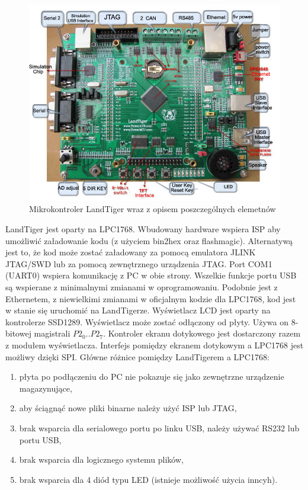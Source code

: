 \documentclass{BscUS}
\begin{document}
\begin{figure}[h]
\centering
\includegraphics{./img/landTiger3}
\caption{Mikrokontroler LandTiger wraz z opisem poszczególnych elemetnów \cite{landTiger3}}
\end{figure}
LandTiger jest oparty na LPC1768. Wbudowany hardware wspiera ISP aby umożliwić załadowanie kodu (z użyciem bin2hex oraz flashmagic).
Alternatywą jest to, że kod może zostać załadowany za pomocą emulatora JLINK JTAG/SWD lub za pomocą zewnętrznego urządzenia JTAG.
\newline
Port COM1 (UART0) wspiera komunikację z PC w obie strony. Wszelkie funkcje portu USB są wspierane z minimalnymi zmianami w oprogramowaniu. Podobnie jest z Ethernetem, z niewielkimi  zmianami w oficjalnym kodzie dla LPC1768, kod jest w stanie się uruchomić na LandTigerze.
\newline
\indent Wyświetlacz LCD jest oparty na kontrolerze SSD1289. Wyświetlacz może zostać odłączony od płyty. Używa on 8-bitowej magistrali \(P2_0..P2_7\). Kontroler ekranu dotykowego jest dostarczony razem z modułem wyświetlacza. Interfejs pomiędzy ekranem dotykowym a LPC1768 jest możliwy dzięki SPI.
\newline
Główne różnice pomiędzy LandTigerem a LPC1768:
\begin{enumerate} [label=(\alph*)]
\item płyta po podłączeniu do PC nie pokazuje się jako zewnętrzne urządzenie magazynujące,
\item aby ściągnąć nowe pliki binarne należy użyć ISP lub JTAG,
\item brak wsparcia dla serialowego portu po linku USB, należy używać RS232 lub portu USB,
\item brak wsparcia dla logicznego systemu plików,
\item brak wsparcia dla 4 diód typu LED (istnieje możliwość użycia inncyh).
\end{enumerate}
\end{document}

